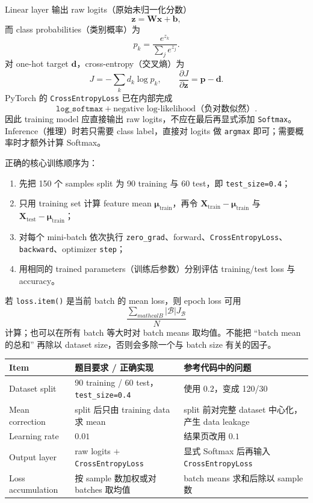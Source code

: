 \begin{checkedsolution}
Linear layer 输出 raw logits（原始未归一化分数）
\[
  \bm z=\bm W\bm x+\bm b,
\]
而 class probabilities（类别概率）为
\[
  p_k=\frac{e^{z_k}}{\sum_j e^{z_j}}.
\]
对 one-hot target $\bm d$，cross-entropy（交叉熵）为
\[
  J=-\sum_k d_k\log p_k,
  \qquad
  \frac{\partial J}{\partial\bm z}=\bm p-\bm d.
\]
PyTorch 的 \texttt{CrossEntropyLoss} 已在内部完成
\[
  \texttt{log\_softmax}+\text{negative log-likelihood（负对数似然）}.
\]
因此 training model 应直接输出 raw logits，不应在最后再显式添加 \texttt{Softmax}。Inference（推理）时若只需要 class label，直接对 logits 做 \texttt{argmax} 即可；需要概率时才额外计算 Softmax。

正确的核心训练顺序为：
\begin{enumerate}
  \item 先把 150 个 samples split 为 90 training 与 60 test，即 \texttt{test\_size=0.4}；
  \item 只用 training set 计算 feature mean $\bm\mu_{\mathrm{train}}$，再令 $\bm X_{\mathrm{train}}-\bm\mu_{\mathrm{train}}$ 与 $\bm X_{\mathrm{test}}-\bm\mu_{\mathrm{train}}$；
  \item 对每个 mini-batch 依次执行 \texttt{zero\_grad}、forward、\texttt{CrossEntropyLoss}、\texttt{backward}、optimizer \texttt{step}；
  \item 用相同的 trained parameters（训练后参数）分别评估 training/test loss 与 accuracy。
\end{enumerate}

若 \texttt{loss.item()} 是当前 batch 的 mean loss，则 epoch loss 可用
\[
  \frac{\sum_{mathcal B}|\mathcal B|J_{\mathcal B}}{N}
\]
计算；也可以在所有 batch 等大时对 batch means 取均值。不能把 ``batch mean 的总和'' 再除以 dataset size，否则会多除一个与 batch size 有关的因子。

\begin{center}
\small
\begin{tabularx}{0.96\textwidth}{@{}p{3.0cm}XX@{}}
  \toprule
  Item & 题目要求 / 正确实现 & 参考代码中的问题 \\
  \midrule
  Dataset split & 90 training / 60 test，\texttt{test\_size=0.4} & 使用 $0.2$，变成 120/30 \\
  Mean correction & split 后只由 training data 求 mean & split 前对完整 dataset 中心化，产生 data leakage \\
  Learning rate & $0.01$ & 结果页改用 $0.1$ \\
  Output layer & raw logits $+$ \texttt{CrossEntropyLoss} & 显式 Softmax 后再输入 \texttt{CrossEntropyLoss} \\
  Loss accumulation & 按 sample 数加权或对 batches 取均值 & batch means 求和后除以 sample 数 \\
  \bottomrule
\end{tabularx}
\end{center}


\end{checkedsolution}
